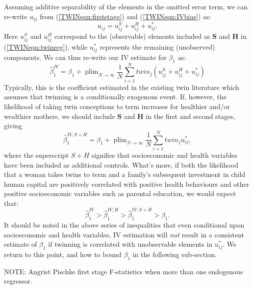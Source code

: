\documentclass[subeqn]{article}
\DeclareMathOperator{\plim}{plim}
\begin{document}
\begin{spacing}{1.4}
Assuming additive separability of the elements in the omitted error term, we can 
re-write $u_{ij}$ from (\ref{TWINeqn:firststage}) and (\ref{TWINeqn:IVbias}) as:
\[ u_{ij}=u^S_{ij}+u^H_{ij}+u^*_{ij}. \]
Here $u^S_{ij}$ and $u^H_{ij}$ correspond to the (observable) elements included 
as $\bm{S}$ and $\bm{H}$ in (\ref{TWINeqn:twinreg}), while $u^*_{ij}$ represents 
the remaining (unobserved) components.  We can thus re-write our IV estimate for 
$\beta_1$ as:
\begin{equation}
\label{TWINeqn:betabias}
\hat\beta_1^{IV} = \beta_1 + 
\plim_{N\to \infty} \frac{1}{N}\sum_{i=1}^N twin_j(u^S_{ij}+u^H_{ij}+u^*_{ij})
\end{equation}
Typically, this is the coefficient estimated in the existing twin literature 
which assumes that twinning is a conditionally exogenous event.  If, however, the 
likelihood of taking twin conceptions to term increases for healthier and/or 
wealthier mothers, we should include $\bm{S}$ and $\bm{H}$ in the first and 
second stages, giving
\begin{equation}
\label{TWINeqn:betacloser}
\hat\beta_1^{IV,S+H} = \beta_1 +
\plim_{N\to \infty} \frac{1}{N}\sum_{i=1}^N twin_ju^*_{ij},
\end{equation}
where the superscript $S+H$ signifies that socioeconomic and health variables 
have been included as additional controls.  What's more, if both the likelihood
that a woman takes twins to term and a family's subsequent investment in child 
human capital are positively correlated with positive health behaviours and other 
positive socioeconomic variables such as parental education, we would expect that:
\[
\hat\beta_1^{IV}>\hat\beta_1^{IV,H}>\hat\beta_1^{IV,S+H}>\beta_1.
\]
It should be noted in the above series of inequalities that even conditional upon
socioeconomic and health variables, IV estimation will \emph{not} result in a
consistent estimate of $\beta_1$ if twinning is correlated with unobservable
elements in $u^*_{ij}$.  We return to this point, and how to bound $\beta_1$ in
the following sub-section.

NOTE: Angrist Pischke first stage F-statistics when more than one endogenous
regressor.


\end{spacing}
\end{document}
